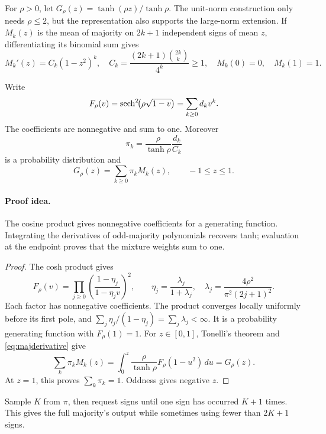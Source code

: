 For \(\rho>0\), let
\(G_\rho(z)=\tanh(\rho z)/\tanh\rho\).
The unit-norm construction only needs \(\rho\le2\), but the
representation also supports the large-norm extension.
If \(M_k(z)\) is the mean of majority on \(2k+1\) independent signs
of mean \(z\), differentiating its binomial sum gives
\begin{equation}\label{eq:majderivative}
M_k'(z)=C_k(1-z^2)^k,\quad
C_k=\frac{(2k+1)\binom{2k}{k}}{4^k}\ge1,\quad
M_k(0)=0,\quad M_k(1)=1.
\end{equation}

\begin{lemma}\label{lem:majority}
Write
\begin{equation}\label{eq:generating}
F_\rho(v)=\operatorname{sech}^2\!\bigl(\rho\sqrt{1-v}\bigr)
=\sum_{k\ge0}d_kv^k.
\end{equation}
The coefficients are nonnegative and sum to one. Moreover
\[
\pi_k=\frac{\rho}{\tanh\rho}\frac{d_k}{C_k}
\]
is a probability distribution and
\begin{equation}\label{eq:majorityexpansion}
G_\rho(z)=\sum_{k\ge0}\pi_kM_k(z),\qquad -1\le z\le1.
\end{equation}
\end{lemma}
\paragraph{Proof idea.}
The cosine product gives nonnegative coefficients for a generating function.
Integrating the derivatives of odd-majority polynomials recovers tanh;
evaluation at the endpoint proves that the mixture weights sum to one.

\begin{proof}
The cosh product \cite{dlmf} gives
\[
F_\rho(v)=\prod_{j\ge0}
 \left(\frac{1-\eta_j}{1-\eta_jv}\right)^2,\qquad
\eta_j=\frac{\lambda_j}{1+\lambda_j},\quad
\lambda_j=\frac{4\rho^2}{\pi^2(2j+1)^2}.
\]
Each factor has nonnegative coefficients. The product converges
locally uniformly before its first pole, and
\(\sum_j\eta_j/(1-\eta_j)=\sum_j\lambda_j<\infty\).
It is a probability generating function with \(F_\rho(1)=1\).
For \(z\in[0,1]\), Tonelli's theorem and
\eqref{eq:majderivative} give
\[
\sum_k\pi_kM_k(z)
=\int_0^z\frac{\rho}{\tanh\rho}F_\rho(1-u^2)\,du
=G_\rho(z).
\]
At \(z=1\), this proves \(\sum_k\pi_k=1\).
Oddness gives negative \(z\).
\end{proof}

Sample \(K\) from \(\pi\), then request signs until one sign has
occurred \(K+1\) times. This gives the full majority's output while
sometimes using fewer than \(2K+1\) signs.

